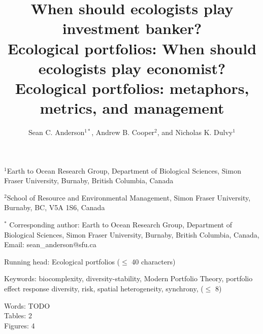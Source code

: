 \documentclass[12pt]{article}
\title{When should ecologists play investment banker?\\
  \bigskip
  Ecological portfolios: When should ecologists play economist?\\
  \bigskip
  Ecological portfolios: metaphors, metrics, and management}
\author{Sean C. Anderson$^{1\ast}$,
  Andrew B. Cooper$^2$,
  and Nicholas K. Dulvy$^1$}
\date{}
\begin{document}
\maketitle
$^1$Earth to Ocean Research Group,
Department of Biological Sciences,
Simon Fraser University,
Burnaby, British Columbia, Canada

$^2$School of Resource and Environmental Management,
Simon Fraser University,
Burnaby, BC, V5A 1S6, Canada

$^{\ast}$
Corresponding author:
Earth to Ocean Research Group,
Department of Biological Sciences,
Simon Fraser University,
Burnaby, British Columbia, Canada,
Email: sean\_anderson@sfu.ca

Running head: Ecological portfolios ($\le$ 40 characters)

Keywords:
biocomplexity,
diversity-stability,
Modern Portfolio Theory,
portfolio effect
response diversity,
risk,
spatial heterogeneity,
synchrony,
($\le$ 8)

Words: TODO\\
Tables: 2\\
Figures: 4\\

\clearpage
\linenumbers
\begin{spacing}{1.6}

\end{spacing}
\end{document}
